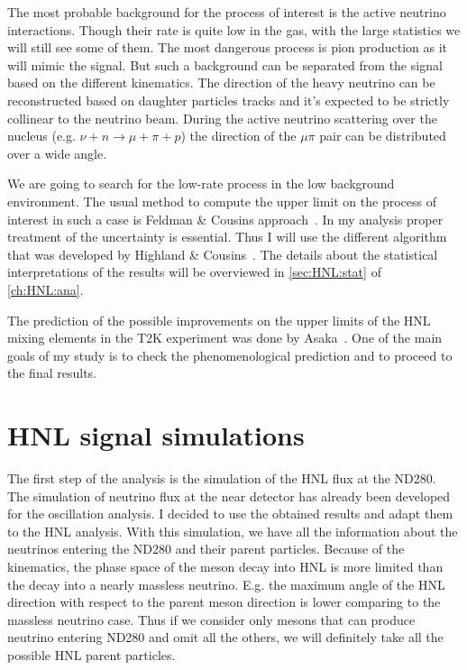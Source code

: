 \documentclass[../main.tex]{subfiles}
\begin{document}
The most probable background for the process of interest is the active neutrino interactions. Though their rate is quite low in the gas, with the large statistics we will still see some of them. The most dangerous process is pion production as it will mimic the signal. But such a background can be separated from the signal based on the different kinematics. The direction of the heavy neutrino can be reconstructed based on daughter particles tracks and it's expected to be strictly collinear to the neutrino beam. During the active neutrino scattering over the nucleus (e.g. $\nu+n\to\mu+\pi+p$) the direction of the $\mu\pi$ pair can be distributed over a wide angle.

\begin{comment}
It happens because of the nuclear effects such as Fermi motion and secondary interactions in nuclei (\autoref{sec:intro:nuclei} of \autoref{ch:nu_phys}). Thus the background can be further reduced with the kinematics cuts. The detailed analysis of the background will be presented in \autoref{sec:HNL:bg} of \autoref{ch:HNL:ana}.
\end{comment}

We are going to search for the low-rate process in the low background environment. The usual method to compute the upper limit on the process of interest in such a case is Feldman \& Cousins approach~\cite{Cousins1998}. In my analysis proper treatment of the uncertainty is essential. Thus I will use the different algorithm that was developed by Highland \& Cousins~\cite{Cousins1992}. The details about the statistical interpretations of the results will be overviewed in \autoref{sec:HNL:stat} of \autoref{ch:HNL:ana}.

The prediction of the possible improvements on the upper limits of the HNL mixing elements in the T2K experiment was done by Asaka~\cite{Asaka2012}. One of the main goals of my study is to check the phenomenological prediction and to proceed to the final results.


\section{HNL signal simulations}
\label{ch:HNL:HNLsim}
The first step of the analysis is the simulation of the HNL flux at the ND280. The simulation of neutrino flux at the near detector has already been developed for the oscillation analysis. I decided to use the obtained results and adapt them to the HNL analysis. With this simulation, we have all the information about the neutrinos entering the ND280 and their parent particles. Because of the kinematics, the phase space of the meson decay into HNL is more limited than the decay into a nearly massless neutrino. E.g. the maximum angle of the HNL direction with respect to the parent meson direction is lower comparing to the massless neutrino case. Thus if we consider only mesons that can produce neutrino entering ND280 and omit all the others, we will definitely take all the possible HNL parent particles.
\end{document}
